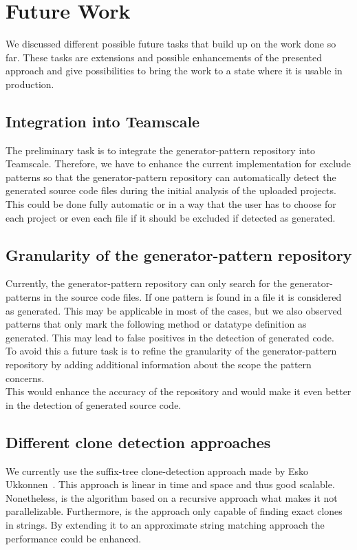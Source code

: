 
\chapter{Future Work}\label{chapter:future}
We discussed different possible future tasks that build up on the work done so far. These tasks are extensions and possible enhancements of the presented approach and give possibilities to bring the work to a state where it is usable in production.

\section{Integration into Teamscale}
The preliminary task is to integrate the generator-pattern repository into Teamscale. Therefore, we have to enhance the current implementation for exclude patterns so that the generator-pattern repository can automatically detect the generated source code files during the initial analysis of the uploaded projects. This could be done fully automatic or in a way that the user has to choose for each project or even each file if it should be excluded if detected as generated.

\section{Granularity of the generator-pattern repository}
Currently, the generator-pattern repository can only search for the generator-patterns in the source code files. If one pattern is found in a file it is considered as generated. This may be applicable in most of the cases, but we also observed patterns that only mark the following method or datatype definition as generated. This may lead to false positives in the detection of generated code.\\
To avoid this a future task is to refine the granularity of the generator-pattern repository by adding additional information about the scope the pattern concerns. \\
This would enhance the accuracy of the repository and would make it even better in the detection of generated source code.

\cleardoublepage{}
\section{Different clone detection approaches}
We currently use the suffix-tree clone-detection approach made by Esko Ukkonnen~\cite{Ukkonen1995}. This approach is linear in time and space and thus good scalable.\\
Nonetheless, is the algorithm based on a recursive approach what makes it not parallelizable. Furthermore, is the approach only capable of finding exact clones in strings. By extending it to an approximate string matching approach the performance could be enhanced.

